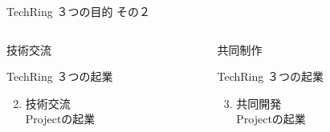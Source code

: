 \documentclass[dvipdfmx]{beamer}
\begin{document}
\begin{frame}{TechRing ３つの目的 その２}
\begin{columns}
    \begin{column}{0.30\textwidth}
      \begin{alertblock}{技術交流}
        \begin{footnotesize}
          TechRing ３つの起業
          \begin{enumerate}
            \setcounter{enumi}{1}
            \item 技術交流\\Projectの起業
          \end{enumerate}
        \end{footnotesize}
      \end{alertblock}
    \end{column}

    \begin{column}{0.30\textwidth}
      \begin{block}{共同制作}
        \begin{footnotesize}
          TechRing ３つの起業 \par
          \begin{enumerate}
            \setcounter{enumi}{2}
            \item 共同開発\\Projectの起業
          \end{enumerate}
        \end{footnotesize}
      \end{block}
    \end{column}
  \end{columns}
\end{frame}
\end{document}
